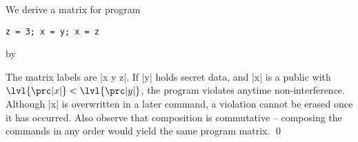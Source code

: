 \begin{example}\label{ex:composition-order}
We derive a matrix for program %
\begin{lstlisting}
z = 3; x = y; x = z
\end{lstlisting}
by

\begin{center}\end{center}
%
The matrix labels are \prc|x y z|.
If \prc|y| holds secret data, and \prc|x| is a public with \(\lvl{\prc|x|} < \lvl{\prc|y|}\), the program violates
anytime non-interference.
Although \prc|x| is overwritten in a later command, a violation cannot be erased once it has occurred.
Also observe that composition is commutative -- composing the commands in any order would yield the same program matrix.
\qed
\end{example}


